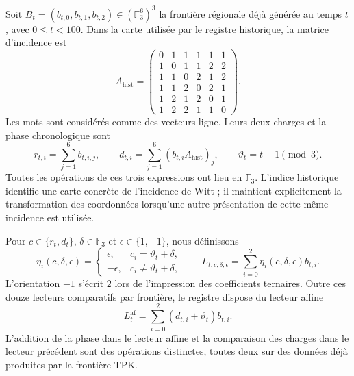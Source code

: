 Soit $B_t=(b_{t,0},b_{t,1},b_{t,2})\in(\mathbb F_3^6)^3$ la frontière
régionale déjà générée au temps $t$, avec $0\leq t<100$. Dans la carte
utilisée par le registre historique, la matrice d'incidence est
\[
 A_{\mathrm{hist}}=
 \begin{pmatrix}
 0&1&1&1&1&1\\
 1&0&1&1&2&2\\
 1&1&0&2&1&2\\
 1&1&2&0&2&1\\
 1&2&1&2&0&1\\
 1&2&2&1&1&0
 \end{pmatrix}.
\]
Les mots sont considérés comme des vecteurs ligne. Leurs deux charges et la phase
chronologique sont
\[
 r_{t,i}=\sum_{j=1}^{6}b_{t,i,j},\qquad
 d_{t,i}=\sum_{j=1}^{6}(b_{t,i}A_{\mathrm{hist}})_j,
 \qquad \vartheta_t=t-1\pmod 3.
\]
Toutes les opérations de ces trois expressions ont lieu en
$\mathbb F_3$. L'indice historique identifie une carte concrète de
l'incidence de Witt ; il maintient explicitement la transformation des coordonnées
lorsqu'une autre présentation de cette même incidence est utilisée.

Pour $c\in\{r_t,d_t\}$, $\delta\in\mathbb F_3$ et
$\epsilon\in\{1,-1\}$, nous définissons
\[
 \eta_i(c,\delta,\epsilon)=
 \begin{cases}
  \epsilon,&c_i=\vartheta_t+\delta,\\
  -\epsilon,&c_i\ne\vartheta_t+\delta,
 \end{cases}
 \qquad
 L_{t,c,\delta,\epsilon}
   =\sum_{i=0}^{2}\eta_i(c,\delta,\epsilon)b_{t,i}.
\]
L'orientation $-1$ s'écrit $2$ lors de l'impression des coefficients
ternaires. Outre ces douze lecteurs comparatifs par frontière, le
registre dispose du lecteur affine
\[
 L^{\mathrm{af}}_t
    =\sum_{i=0}^{2}(d_{t,i}+\vartheta_t)b_{t,i}.
\]
L'addition de la phase dans le lecteur affine et la comparaison des charges dans
le lecteur précédent sont des opérations distinctes, toutes deux sur des données déjà
produites par la frontière TPK.

